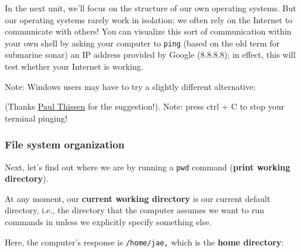 \documentclass[
  letterpaper,
  DIV=11,
  numbers=noendperiod]{scrreprt}
\newenvironment{Shaded}{\begin{snugshade}}{\end{snugshade}}
\newcommand{\AttributeTok}[1]{\textcolor[rgb]{0.40,0.45,0.13}{#1}}
\newcommand{\ExtensionTok}[1]{\textcolor[rgb]{0.00,0.23,0.31}{#1}}
\newcommand{\NormalTok}[1]{\textcolor[rgb]{0.00,0.23,0.31}{#1}}
\begin{document}
In the next unit, we'll focus on the structure of our own operating
systems. But our operating systems rarely work in isolation; we often
rely on the Internet to communicate with others! You can visualize this
sort of communication within your own shell by asking your computer to
\texttt{ping} (based on the old term for submarine sonar) an IP address
provided by Google (8.8.8.8); in effect, this will test whether your
Internet is working.

\begin{Shaded}
\end{Shaded}

Note: Windows users may have to try a slightly different alternative:

\begin{Shaded}
\end{Shaded}

(Thanks \href{http://www.paulthissen.org/}{Paul Thissen} for the
suggestion!). Note: press ctrl + C to stop your terminal pinging!

\hypertarget{file-system-organization}{%
\subsubsection*{File system
organization}\label{file-system-organization}}

Next, let's find out where we are by running a \texttt{pwd} command
(\textbf{print working directory}).

At any moment, our \textbf{current working directory} is our current
default directory, i.e., the directory that the computer assumes we want
to run commands in unless we explicitly specify something else.

Here, the computer's response is \texttt{/home/jae,} which is the
\textbf{home directory}:

\begin{Shaded}
\end{Shaded}
\end{document}
